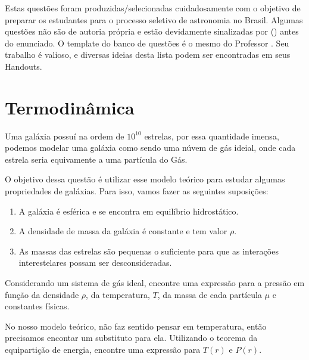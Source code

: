 \documentclass[11pt]{article}
\begin{document}

Estas questões foram produzidas/selecionadas cuidadosamente com o objetivo de preparar os estudantes para o processo seletivo de astronomia no Brasil. Algumas questões não são de autoria própria e estão devidamente sinalizadas por () antes do enunciado. O template do banco de questões é o mesmo do Professor . Seu trabalho é valioso, e diversas ideias desta lista podem ser encontradas em seus Handouts.




\section{Termodinâmica}
\begin{pproblem}
    Uma galáxia possuí na ordem de \(10^{10}\) estrelas, por essa quantidade imensa, podemos modelar uma galáxia como sendo uma núvem de gás ideial, onde cada estrela seria equivamente a uma partícula do Gás. 
    
    O objetivo dessa questão é utilizar esse modelo teórico para estudar algumas propriedades de galáxias. Para isso, vamos fazer as seguintes suposições:

    \begin{enumerate}[label=\roman*)]
        \item A galáxia é esférica e se encontra em equilíbrio hidrostático.
        \item A densidade de massa da galáxia é constante e tem valor \(\rho\).
        \item As massas das estrelas são pequenas o suficiente para que as interações interestelares possam ser desconsideradas.
    \end{enumerate}
    
    \begin{alternativas}
        \item Considerando um sistema de gás ideal, encontre uma expressão para a pressão em função da densidade \(\rho\), da temperatura, \(T\), da massa de cada partícula \(\mu\) e constantes físicas.
        
        \item No nosso modelo teórico, não faz sentido pensar em temperatura, então precisamos encontar um substituto para ela. Utilizando o teorema da equipartição de energia, encontre uma expressão para \(T(r)\) e \(P(r)\).
    \end{alternativas}

\end{pproblem}
\end{document}
